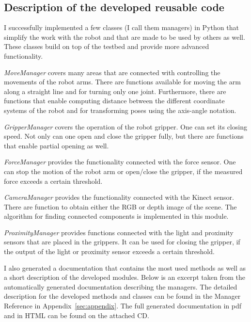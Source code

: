     \subsection{Description of the developed reusable code}
        I successfully implemented a few classes (I call them managers) in Python that simplify the work with the \CloPeMa\/ robot and that are made to be used by others as well. These classes build on top of the \CloPeMa\/ testbed and provide more advanced functionality.

        \emph{MoveManager} covers many areas that are connected with controlling the movements of the robot arms. There are functions available for moving the arm along a straight line and for turning only one joint. Furthermore, there are functions that enable computing distance between the different coordinate systems of the robot and for transforming poses using the axis-angle notation.

        \emph{GripperManager} covers the operation of the robot gripper. One can set its closing speed. Not only can one open and close the gripper fully, but there are functions that enable partial opening as well.

        \emph{ForceManager} provides the functionality connected with the force sensor. One can stop the motion of the robot arm or open/close the gripper, if the measured force exceeds a certain threshold.

        \emph{CameraManager} provides the functionality connected with the Kinect sensor. There are function to obtain either the RGB or depth image of the scene. The algorithm for finding connected components is implemented in this module.

        \emph{ProximityManager} provides functions connected with the light and proximity sensors that are placed in the grippers. It can be used for closing the gripper, if the output of the light or proximity sensor exceeds a certain threshold.

        I also generated a documentation that contains the most used methods as well as a short description of the developed modules. Below is an excerpt taken from the automatically generated documentation describing the managers. The detailed description for the developed methods and classes can be found in the Manager Reference in Appendix~\ref{sec:appendix}. The full generated documentation in pdf and in HTML can be found on the attached CD.

        

    
